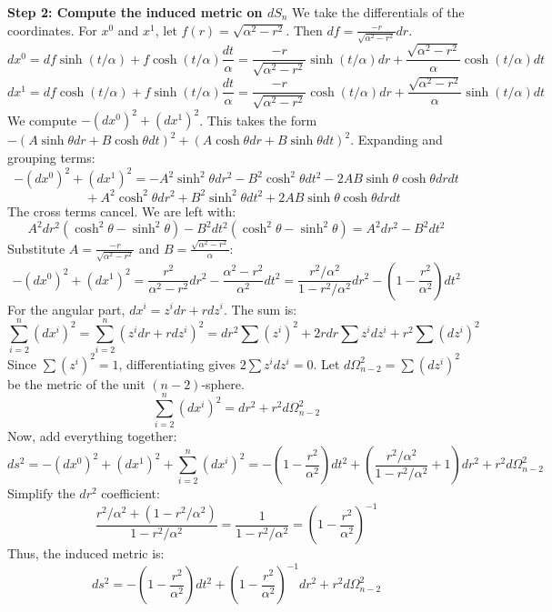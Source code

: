 \begin{solution}
\textbf{Step 2: Compute the induced metric on $dS_n$}
We take the differentials of the coordinates.
For $x^0$ and $x^1$, let $f(r) = \sqrt{\alpha^2 - r^2}$. Then $df = \frac{-r}{\sqrt{\alpha^2 - r^2}} dr$.
\[ dx^0 = df \sinh(t/\alpha) + f \cosh(t/\alpha) \frac{dt}{\alpha} = \frac{-r}{\sqrt{\alpha^2 - r^2}} \sinh(t/\alpha) dr + \frac{\sqrt{\alpha^2 - r^2}}{\alpha} \cosh(t/\alpha) dt \]
\[ dx^1 = df \cosh(t/\alpha) + f \sinh(t/\alpha) \frac{dt}{\alpha} = \frac{-r}{\sqrt{\alpha^2 - r^2}} \cosh(t/\alpha) dr + \frac{\sqrt{\alpha^2 - r^2}}{\alpha} \sinh(t/\alpha) dt \]
We compute $-(dx^0)^2 + (dx^1)^2$. This takes the form $-(A \sinh \theta dr + B \cosh \theta dt)^2 + (A \cosh \theta dr + B \sinh \theta dt)^2$.
Expanding and grouping terms:
\[ -(dx^0)^2 + (dx^1)^2 = -A^2 \sinh^2 \theta dr^2 - B^2 \cosh^2 \theta dt^2 - 2AB \sinh\theta \cosh\theta dr dt \]
\[ \quad + A^2 \cosh^2 \theta dr^2 + B^2 \sinh^2 \theta dt^2 + 2AB \sinh\theta \cosh\theta dr dt \]
The cross terms cancel. We are left with:
\[ A^2 dr^2 (\cosh^2\theta - \sinh^2\theta) - B^2 dt^2 (\cosh^2\theta - \sinh^2\theta) = A^2 dr^2 - B^2 dt^2 \]
Substitute $A = \frac{-r}{\sqrt{\alpha^2 - r^2}}$ and $B = \frac{\sqrt{\alpha^2 - r^2}}{\alpha}$:
\[ -(dx^0)^2 + (dx^1)^2 = \frac{r^2}{\alpha^2 - r^2} dr^2 - \frac{\alpha^2 - r^2}{\alpha^2} dt^2 = \frac{r^2/\alpha^2}{1 - r^2/\alpha^2} dr^2 - \left(1 - \frac{r^2}{\alpha^2}\right) dt^2 \]
For the angular part, $dx^i = z^i dr + r dz^i$. The sum is:
\[ \sum_{i=2}^n (dx^i)^2 = \sum_{i=2}^n (z^i dr + r dz^i)^2 = dr^2 \sum (z^i)^2 + 2r dr \sum z^i dz^i + r^2 \sum (dz^i)^2 \]
Since $\sum (z^i)^2 = 1$, differentiating gives $2 \sum z^i dz^i = 0$. Let $d\Omega_{n-2}^2 = \sum (dz^i)^2$ be the metric of the unit $(n-2)$-sphere.
\[ \sum_{i=2}^n (dx^i)^2 = dr^2 + r^2 d\Omega_{n-2}^2 \]
Now, add everything together:
\[ ds^2 = -(dx^0)^2 + (dx^1)^2 + \sum_{i=2}^n (dx^i)^2 = - \left(1 - \frac{r^2}{\alpha^2}\right) dt^2 + \left( \frac{r^2/\alpha^2}{1 - r^2/\alpha^2} + 1 \right) dr^2 + r^2 d\Omega_{n-2}^2 \]
Simplify the $dr^2$ coefficient:
\[ \frac{r^2/\alpha^2 + (1 - r^2/\alpha^2)}{1 - r^2/\alpha^2} = \frac{1}{1 - r^2/\alpha^2} = \left(1 - \frac{r^2}{\alpha^2}\right)^{-1} \]
Thus, the induced metric is:
\[ ds^2 = - \left(1 - \frac{r^2}{\alpha^2}\right) dt^2 + \left(1 - \frac{r^2}{\alpha^2}\right)^{-1} dr^2 + r^2 d\Omega_{n-2}^2 \]


\end{solution}
